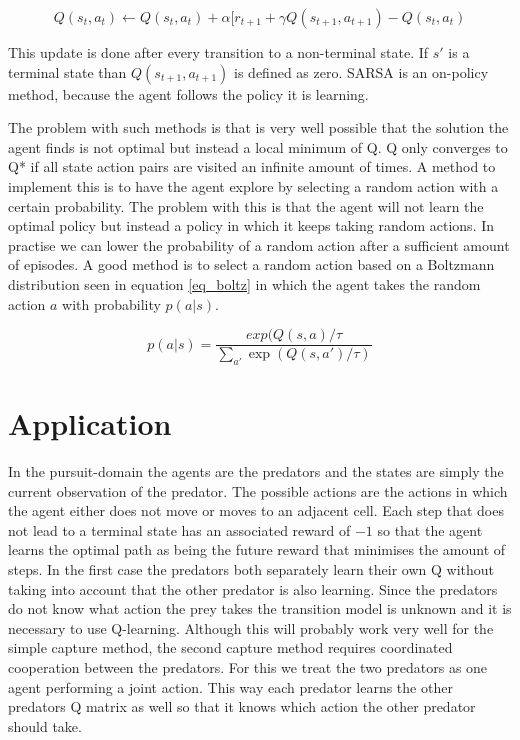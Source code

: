 \documentclass[10pt]{article}
\begin{document}
\begin{equation}\label{eq_SARSA}
	Q(s_t,a_t) \leftarrow Q(s_t,a_t) + \alpha[r_{t+1} + \gamma Q(s_{t+1},a_{t+1})-Q(s_t,a_t)
\end{equation}

This update is done after every transition to a non-terminal state. If $s'$ is a terminal state than $Q(s_{t+1},a_{t+1})$ is defined as zero. SARSA is an on-policy method, because the agent follows the policy it is learning.

The problem with such methods is that is very well possible that the solution the agent finds is not optimal but instead a local minimum of Q. Q only converges to Q* if all state action pairs are visited an infinite amount of times. A method to implement this is to have the agent explore by selecting a random action with a certain probability. The problem with this is that the agent will not learn the optimal policy but instead a policy in which it keeps taking random actions. In practise we can lower the probability of a random action after a sufficient amount of episodes. A good method is to select a random action based on a Boltzmann distribution seen in equation \ref{eq_boltz} in which the agent takes the random action $a$ with probability $p(a|s)$.

\begin{equation}\label{eq_boltz}
	p(a|s) = \frac{exp(Q(s,a)/\tau}{\sum_{a'}\exp(Q(s,a')/\tau)}
\end{equation}



\section{Application}\label{application}
In the pursuit-domain the agents are the predators and the states are simply the current observation of the predator. The possible actions are the actions in which the agent either does not move or moves to an adjacent cell. Each step that does not lead to a terminal state has an associated reward of $-1$ so that the agent learns the optimal path as being the future reward that minimises the amount of steps. In the first case the predators both separately learn their own Q without taking into account that the other predator is also learning. Since the predators do not know what action the prey takes the transition model is unknown and it is necessary to use Q-learning. Although this will probably work very well for the simple capture method, the second capture method requires coordinated cooperation between the predators. For this we treat the two predators as one agent performing a joint action. This way each predator learns the other predators Q matrix as well so that it knows which action the other predator should take.
\end{document}
